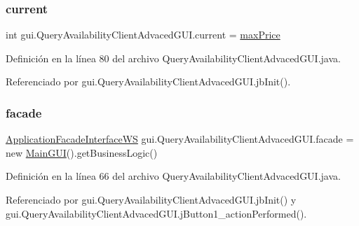 \mbox{\label{classgui_1_1_query_availability_client_advaced_g_u_i_a6d8d598cf63230a1751701ca290a77d7}} 
\subsubsection{\texorpdfstring{current}{current}}
{\footnotesize\ttfamily int gui.\+Query\+Availability\+Client\+Advaced\+G\+U\+I.\+current = \mbox{\hyperlink{classgui_1_1_query_availability_client_advaced_g_u_i_a518ac2fa95f208a8c9cda2c90b3503d4}{max\+Price}}\hspace{0.3cm}{\ttfamily [private]}}



Definición en la línea 80 del archivo Query\+Availability\+Client\+Advaced\+G\+U\+I.\+java.



Referenciado por gui.\+Query\+Availability\+Client\+Advaced\+G\+U\+I.\+jb\+Init().

\mbox{\label{classgui_1_1_query_availability_client_advaced_g_u_i_ae8664f7594365748b41e753bed1d338d}} 
\subsubsection{\texorpdfstring{facade}{facade}}
{\footnotesize\ttfamily \mbox{\hyperlink{interfacebusiness_logic_1_1_application_facade_interface_w_s}{Application\+Facade\+Interface\+WS}} gui.\+Query\+Availability\+Client\+Advaced\+G\+U\+I.\+facade = new \mbox{\hyperlink{classgui_1_1_main_g_u_i}{Main\+G\+UI}}().get\+Business\+Logic()\hspace{0.3cm}{\ttfamily [private]}}



Definición en la línea 66 del archivo Query\+Availability\+Client\+Advaced\+G\+U\+I.\+java.



Referenciado por gui.\+Query\+Availability\+Client\+Advaced\+G\+U\+I.\+jb\+Init() y gui.\+Query\+Availability\+Client\+Advaced\+G\+U\+I.\+j\+Button1\+\_\+action\+Performed().

